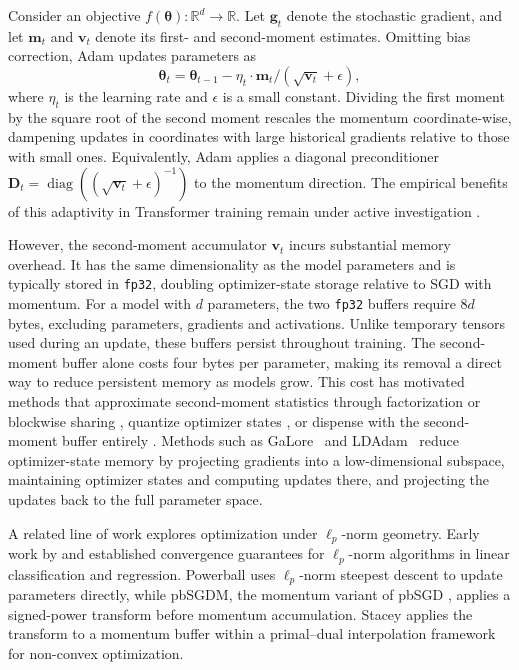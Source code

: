 \documentclass{article}
\begin{document}
Consider an objective $f(\boldsymbol{\theta}):\mathbb{R}^d\to\mathbb{R}$. Let $\mathbf{g}_t$ denote the stochastic gradient, and let $\mathbf{m}_t$ and $\mathbf{v}_t$ denote its first- and second-moment estimates. Omitting bias correction, Adam updates parameters as
\begin{equation}
\boldsymbol{\theta}_t = \boldsymbol{\theta}_{t-1} - \eta_t \cdot \mathbf{m}_t / (\sqrt{\mathbf{v}_t} + \epsilon),
\end{equation}
where $\eta_t$ is the learning rate and $\epsilon$ is a small constant. Dividing the first moment by the square root of the second moment rescales the momentum coordinate-wise, dampening updates in coordinates with large historical gradients relative to those with small ones. Equivalently, Adam applies a diagonal preconditioner $\mathbf{D}_t=\operatorname{diag}((\sqrt{\mathbf{v}_t}+\epsilon)^{-1})$ to the momentum direction. The empirical benefits of this adaptivity in Transformer training remain under active investigation \citep{balles2018dissecting,pan2022directional,kunstner2023noise,zhang2024why,tomihari2025understanding,zhao2025deconstructing,jin2026adam}.

However, the second-moment accumulator $\mathbf{v}_t$ incurs substantial memory overhead. It has the same dimensionality as the model parameters and is typically stored in \texttt{fp32}, doubling optimizer-state storage relative to SGD with momentum. For a model with $d$ parameters, the two \texttt{fp32} buffers require $8d$ bytes, excluding parameters, gradients and activations. Unlike temporary tensors used during an update, these buffers persist throughout training. The second-moment buffer alone costs four bytes per parameter, making its removal a direct way to reduce persistent memory as models grow. This cost has motivated methods that approximate second-moment statistics through factorization \citep{shazeer2018adafactor} or blockwise sharing \citep{zheng2019blockwise,zhang2025adammini}, quantize optimizer states \citep{dettmers2022bit,li2024memory,han2025qadam}, or dispense with the second-moment buffer entirely \citep{bernstein2018signsgd,balles2018dissecting,chen2024symbolic,zhang2025adams}. Methods such as GaLore~\citep{zhao2024galore} and LDAdam~\citep{robert2024ldadam} reduce optimizer-state memory by projecting gradients into a low-dimensional subspace, maintaining optimizer states and computing updates there, and projecting the updates back to the full parameter space.

A related line of work explores optimization under $\ell_p$-norm geometry. Early work by \citet{grove2001general} and \citet{gentile2003robustness} established convergence guarantees for $\ell_p$-norm algorithms in linear classification and regression. Powerball \citep{yuan2019powerball} uses $\ell_p$-norm steepest descent to update parameters directly, while pbSGDM, the momentum variant of pbSGD \citep{zhou2021pbsgd}, applies a signed-power transform before momentum accumulation. Stacey \citep{luo2025stacey} applies the transform to a momentum buffer within a primal--dual interpolation framework for non-convex optimization.
\end{document}
